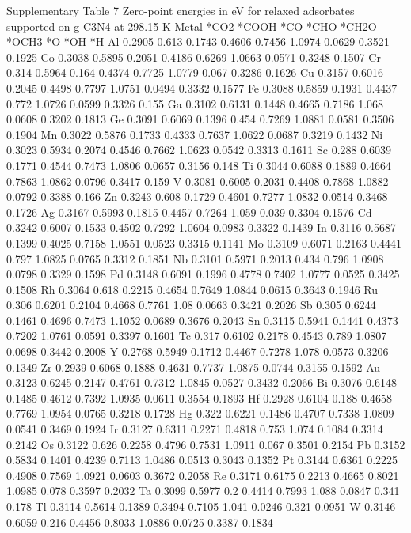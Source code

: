 Supplementary Table 7
Zero-point energies in eV for relaxed adsorbates supported on g-C3N4 at 298.15 K
Metal	*CO2	*COOH	*CO	*CHO	*CH2O	*OCH3	*O	*OH	*H
Al	0.2905	0.613	0.1743	0.4606	0.7456	1.0974	0.0629	0.3521	0.1925
Co	0.3038	0.5895	0.2051	0.4186	0.6269	1.0663	0.0571	0.3248	0.1507
Cr	0.314	0.5964	0.164	0.4374	0.7725	1.0779	0.067	0.3286	0.1626
Cu	0.3157	0.6016	0.2045	0.4498	0.7797	1.0751	0.0494	0.3332	0.1577
Fe	0.3088	0.5859	0.1931	0.4437	0.772	1.0726	0.0599	0.3326	0.155
Ga	0.3102	0.6131	0.1448	0.4665	0.7186	1.068	0.0608	0.3202	0.1813
Ge	0.3091	0.6069	0.1396	0.454	0.7269	1.0881	0.0581	0.3506	0.1904
Mn	0.3022	0.5876	0.1733	0.4333	0.7637	1.0622	0.0687	0.3219	0.1432
Ni	0.3023	0.5934	0.2074	0.4546	0.7662	1.0623	0.0542	0.3313	0.1611
Sc	0.288	0.6039	0.1771	0.4544	0.7473	1.0806	0.0657	0.3156	0.148
Ti	0.3044	0.6088	0.1889	0.4664	0.7863	1.0862	0.0796	0.3417	0.159
V	0.3081	0.6005	0.2031	0.4408	0.7868	1.0882	0.0792	0.3388	0.166
Zn	0.3243	0.608	0.1729	0.4601	0.7277	1.0832	0.0514	0.3468	0.1726
Ag	0.3167	0.5993	0.1815	0.4457	0.7264	1.059	0.039	0.3304	0.1576
Cd	0.3242	0.6007	0.1533	0.4502	0.7292	1.0604	0.0983	0.3322	0.1439
In	0.3116	0.5687	0.1399	0.4025	0.7158	1.0551	0.0523	0.3315	0.1141
Mo	0.3109	0.6071	0.2163	0.4441	0.797	1.0825	0.0765	0.3312	0.1851
Nb	0.3101	0.5971	0.2013	0.434	0.796	1.0908	0.0798	0.3329	0.1598
Pd	0.3148	0.6091	0.1996	0.4778	0.7402	1.0777	0.0525	0.3425	0.1508
Rh	0.3064	0.618	0.2215	0.4654	0.7649	1.0844	0.0615	0.3643	0.1946
Ru	0.306	0.6201	0.2104	0.4668	0.7761	1.08	0.0663	0.3421	0.2026
Sb	0.305	0.6244	0.1461	0.4696	0.7473	1.1052	0.0689	0.3676	0.2043
Sn	0.3115	0.5941	0.1441	0.4373	0.7202	1.0761	0.0591	0.3397	0.1601
Tc	0.317	0.6102	0.2178	0.4543	0.789	1.0807	0.0698	0.3442	0.2008
Y	0.2768	0.5949	0.1712	0.4467	0.7278	1.078	0.0573	0.3206	0.1349
Zr	0.2939	0.6068	0.1888	0.4631	0.7737	1.0875	0.0744	0.3155	0.1592
Au	0.3123	0.6245	0.2147	0.4761	0.7312	1.0845	0.0527	0.3432	0.2066
Bi	0.3076	0.6148	0.1485	0.4612	0.7392	1.0935	0.0611	0.3554	0.1893
Hf	0.2928	0.6104	0.188	0.4658	0.7769	1.0954	0.0765	0.3218	0.1728
Hg	0.322	0.6221	0.1486	0.4707	0.7338	1.0809	0.0541	0.3469	0.1924
Ir	0.3127	0.6311	0.2271	0.4818	0.753	1.074	0.1084	0.3314	0.2142
Os	0.3122	0.626	0.2258	0.4796	0.7531	1.0911	0.067	0.3501	0.2154
Pb	0.3152	0.5834	0.1401	0.4239	0.7113	1.0486	0.0513	0.3043	0.1352
Pt	0.3144	0.6361	0.2225	0.4908	0.7569	1.0921	0.0603	0.3672	0.2058
Re	0.3171	0.6175	0.2213	0.4665	0.8021	1.0985	0.078	0.3597	0.2032
Ta	0.3099	0.5977	0.2		0.4414	0.7993	1.088	0.0847	0.341	0.178
Tl	0.3114	0.5614	0.1389	0.3494	0.7105	1.041	0.0246	0.321	0.0951
W	0.3146	0.6059	0.216	0.4456	0.8033	1.0886	0.0725	0.3387	0.1834


